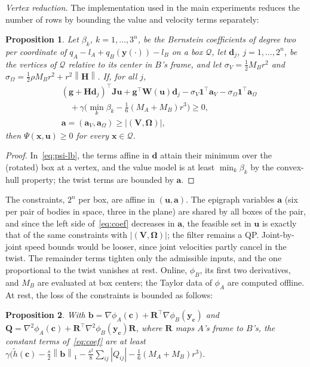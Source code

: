 \documentclass[journal]{IEEEtran}
\newtheorem{proposition}{Proposition}
\theoremstyle{definition}
\newcommand{\norm}[1]{\left\lVert #1\right\rVert}
\newcommand{\Rot}{\mathbf{R}}
\begin{document}
\emph{Vertex reduction.} The implementation used in the main experiments reduces
the number of rows by bounding the value and velocity terms separately:
\begin{proposition}\label{prop:coef}
Let $\beta_k$, $k=1,\dots,3^n$, be the Bernstein coefficients of degree two per coordinate of
$q_A-l_A+q_B(\mathbf y(\cdot))-l_B$ on a box $\mathcal Q$, let $\mathbf d_j$, $j=1,\dots,2^n$, be the
vertices of $\mathcal Q$ relative to its center in $B$'s frame, and let
$\sigma_V=\frac12M_Br^2$ and $\sigma_\Omega=\frac12\rho M_Br^2+r^2\norm{\mathbf H}$. If, for all $j$,
\begin{equation}\label{eq:coef}
\begin{aligned}
&(\mathbf g+\mathbf H\mathbf d_j)^\top\mathbf J\mathbf u+\mathbf g^\top\mathbf W(\mathbf u)\mathbf d_j
-\sigma_V\mathbf 1^{\!\top}\mathbf a_V-\sigma_\Omega\mathbf 1^{\!\top}\mathbf a_\Omega\\
&\quad+\gamma\big(\min_k\beta_k-\tfrac16(M_A+M_B)r^3\big)\ge0,\\
&\mathbf a=(\mathbf a_V,\mathbf a_\Omega)\ge|(\mathbf V,\boldsymbol\Omega)|,
\end{aligned}
\end{equation}
then $\Psi(\mathbf x,\mathbf u)\ge0$ for every $\mathbf x\in\mathcal Q$.
\end{proposition}
\begin{proof}
In~\eqref{eq:psi-lb}, the terms affine in $\mathbf d$ attain their minimum over the (rotated) box at a
vertex, and the value model is at least $\min_k\beta_k$ by the convex-hull property; the twist terms
are bounded by $\mathbf a$.
\end{proof}
The constraints, $2^n$ per box, are affine in $(\mathbf u,\mathbf a)$. The epigraph variables $\mathbf a$ (six per pair of
bodies in space, three in the plane) are shared by all boxes of the pair, and since the left side
of~\eqref{eq:coef} decreases in $\mathbf a$, the feasible set in $\mathbf u$ is exactly that of the same
constraints with $|(\mathbf V,\boldsymbol\Omega)|$; the filter remains a QP. Joint-by-joint speed bounds
would be looser, since joint velocities partly cancel in the twist.
The remainder terms tighten only the admissible inputs, and the one
proportional to the twist vanishes at rest. Online, $\phi_B$, its first two derivatives, and $M_B$ are
evaluated at box centers; the Taylor data of $\phi_A$ are computed offline. At rest, the loss of the
constraints is bounded as follows:
\begin{proposition}\label{prop:tight}
With $\mathbf b=\nabla\phi_A(\mathbf c)+\Rot^\top\nabla\phi_B(\mathbf y_{\mathbf c})$ and
$\mathbf Q=\nabla^2\phi_A(\mathbf c)+\Rot^\top\nabla^2\phi_B(\mathbf y_{\mathbf c})\Rot$, where
$\Rot$ maps $A$'s frame to $B$'s, the constant terms of~\eqref{eq:coef} are at least
$\gamma\big(\tilde h(\mathbf c)-\tfrac s2\norm{\mathbf b}_1-\tfrac{s^2}8\sum_{ij}|Q_{ij}|
-\tfrac16(M_A+M_B)r^3\big)$.
\end{proposition}
\end{document}
